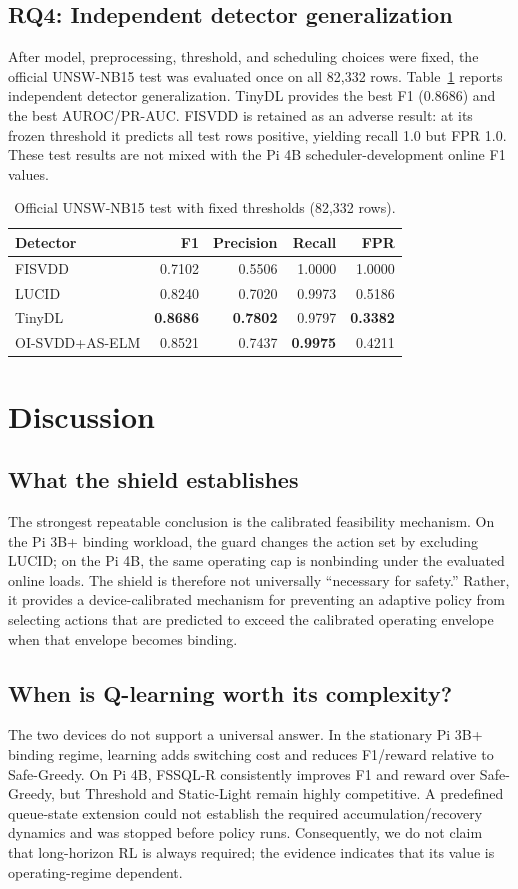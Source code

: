 \documentclass[journal]{IEEEtran}
\begin{document}
\subsection{RQ4: Independent detector generalization}
After model, preprocessing, threshold, and scheduling choices were fixed, the official UNSW-NB15 test was evaluated once on all 82,332 rows. Table~\ref{tab:test} reports independent detector generalization. TinyDL provides the best F1 (0.8686) and the best AUROC/PR-AUC. FISVDD is retained as an adverse result: at its frozen threshold it predicts all test rows positive, yielding recall 1.0 but FPR 1.0. These test results are not mixed with the Pi 4B scheduler-development online F1 values.

\begin{table}[t]
\caption{Official UNSW-NB15 test with fixed thresholds (82,332 rows).}
\label{tab:test}
\centering\footnotesize
\begin{tabular}{lrrrr}
\toprule
Detector & F1 & Precision & Recall & FPR \\
\midrule
FISVDD & 0.7102 & 0.5506 & 1.0000 & 1.0000 \\
LUCID & 0.8240 & 0.7020 & 0.9973 & 0.5186 \\
TinyDL & \textbf{0.8686} & \textbf{0.7802} & 0.9797 & \textbf{0.3382} \\
OI-SVDD+AS-ELM & 0.8521 & 0.7437 & \textbf{0.9975} & 0.4211 \\
\bottomrule
\end{tabular}
\end{table}

\section{Discussion}
\subsection{What the shield establishes}
The strongest repeatable conclusion is the calibrated feasibility mechanism. On the Pi 3B+ binding workload, the guard changes the action set by excluding LUCID; on the Pi 4B, the same operating cap is nonbinding under the evaluated online loads. The shield is therefore not universally ``necessary for safety.'' Rather, it provides a device-calibrated mechanism for preventing an adaptive policy from selecting actions that are predicted to exceed the calibrated operating envelope when that envelope becomes binding.

\subsection{When is Q-learning worth its complexity?}
The two devices do not support a universal answer. In the stationary Pi 3B+ binding regime, learning adds switching cost and reduces F1/reward relative to Safe-Greedy. On Pi 4B, FSSQL-R consistently improves F1 and reward over Safe-Greedy, but Threshold and Static-Light remain highly competitive. A predefined queue-state extension could not establish the required accumulation/recovery dynamics and was stopped before policy runs. Consequently, we do not claim that long-horizon RL is always required; the evidence indicates that its value is operating-regime dependent.
\end{document}
